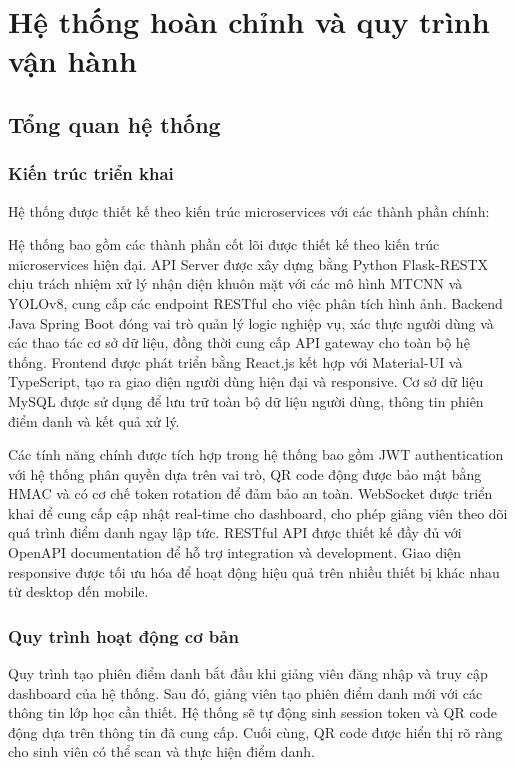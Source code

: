 \documentclass[12pt,a4paper]{report}
\begin{document}
\chapter{Hệ thống hoàn chỉnh và quy trình vận hành}
\section{Tổng quan hệ thống}
\subsection{Kiến trúc triển khai}
Hệ thống được thiết kế theo kiến trúc microservices với các thành phần chính:

Hệ thống bao gồm các thành phần cốt lõi được thiết kế theo kiến trúc microservices hiện đại. API Server được xây dựng bằng Python Flask-RESTX chịu trách nhiệm xử lý nhận diện khuôn mặt với các mô hình MTCNN và YOLOv8, cung cấp các endpoint RESTful cho việc phân tích hình ảnh. Backend Java Spring Boot đóng vai trò quản lý logic nghiệp vụ, xác thực người dùng và các thao tác cơ sở dữ liệu, đồng thời cung cấp API gateway cho toàn bộ hệ thống. Frontend được phát triển bằng React.js kết hợp với Material-UI và TypeScript, tạo ra giao diện người dùng hiện đại và responsive. Cơ sở dữ liệu MySQL được sử dụng để lưu trữ toàn bộ dữ liệu người dùng, thông tin phiên điểm danh và kết quả xử lý.

Các tính năng chính được tích hợp trong hệ thống bao gồm JWT authentication với hệ thống phân quyền dựa trên vai trò, QR code động được bảo mật bằng HMAC và có cơ chế token rotation để đảm bảo an toàn. WebSocket được triển khai để cung cấp cập nhật real-time cho dashboard, cho phép giảng viên theo dõi quá trình điểm danh ngay lập tức. RESTful API được thiết kế đầy đủ với OpenAPI documentation để hỗ trợ integration và development. Giao diện responsive được tối ưu hóa để hoạt động hiệu quả trên nhiều thiết bị khác nhau từ desktop đến mobile.

\subsection{Quy trình hoạt động cơ bản}
Quy trình tạo phiên điểm danh bắt đầu khi giảng viên đăng nhập và truy cập dashboard của hệ thống. Sau đó, giảng viên tạo phiên điểm danh mới với các thông tin lớp học cần thiết. Hệ thống sẽ tự động sinh session token và QR code động dựa trên thông tin đã cung cấp. Cuối cùng, QR code được hiển thị rõ ràng cho sinh viên có thể scan và thực hiện điểm danh.
\end{document}
